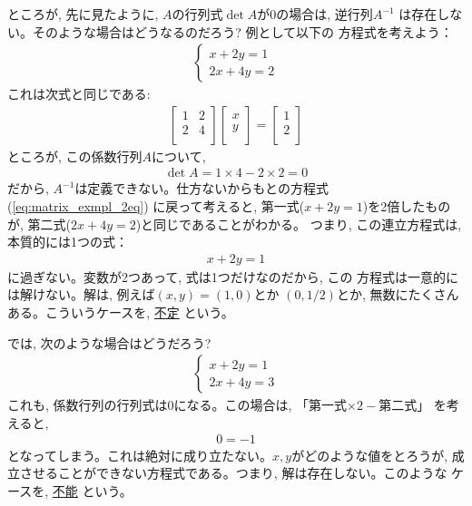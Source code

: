 ところが, 先に見たように, $A$の行列式$\det A$が0の場合は, 逆行列$A^{-1}$
は存在しない。そのような場合はどうなるのだろう? 例として以下の
方程式を考えよう：
\begin{eqnarray}\begin{cases}
x+2y=1\\
2x+4y=2
\end{cases}\label{eq:matrix_exmpl_2eq}\end{eqnarray}
これは次式と同じである:
\begin{eqnarray}
\begin{bmatrix}
1 & 2 \\
2 & 4 \\
\end{bmatrix}
\begin{bmatrix}
x \\
y \\
\end{bmatrix}
=\begin{bmatrix}
1 \\
2 \\
\end{bmatrix}
\end{eqnarray}
ところが, この係数行列$A$について, 
\begin{eqnarray*}\det A=1\times4-2\times2=0\end{eqnarray*}
だから, $A^{-1}$は定義できない。仕方ないからもとの方程式(\ref{eq:matrix_exmpl_2eq})
に戻って考えると, 第一式($x+2y=1$)を2倍したものが, 第二式($2x+4y=2$)と同じであることがわかる。
つまり, この連立方程式は, 本質的には1つの式：
\begin{eqnarray}
x+2y=1
\end{eqnarray}
に過ぎない。変数が2つあって, 式は1つだけなのだから, この
方程式は一意的には解けない。解は, 例えば$(x, y)=(1, 0)$とか
$(0, 1/2)$とか, 無数にたくさんある。こういうケースを, \underline{不定}
という。

では, 次のような場合はどうだろう? 
\begin{eqnarray}\begin{cases}
x+2y=1\\
2x+4y=3
\end{cases}\end{eqnarray}
これも, 係数行列の行列式は0になる。この場合は, 「第一式$\times2-$第二式」
を考えると, 
\begin{eqnarray}
0=-1
\end{eqnarray}
となってしまう。これは絶対に成り立たない。$x, y$がどのような値をとろうが, 
成立させることができない方程式である。つまり, 解は存在しない。このような
ケースを, \underline{不能} という。
\vv


